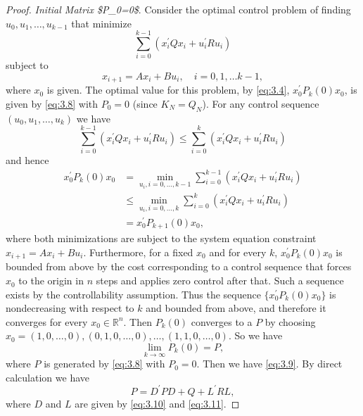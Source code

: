 \begin{proof}
\textit{Initial Matrix \$P\_0=0\$}. 
    Consider the optimal control problem of finding $u_0,u_1,\dots,u_{k-1}$ that minimize
    \[\sum_{i=0}^{k-1} (x_i^\prime Q x_i + u_i^\prime R u_i)\]
    subject to \[x_{i + 1} = Ax_i + Bu_i,\quad i = 0,1,\dots k - 1,\]
    where $x_0$ is given. The optimal value for this problem, by \cref{eq:3.4}, $x_0^\prime P_k(0) x_0$, is given by \cref{eq:3.8} with $P_0=0 $ (since $K_N=Q_N$). 
    For any control sequence ${(u_0,u_1,\dots,u_{k})} $ we have 
    \[\sum_{i=0}^{k-1} (x_i^\prime Q x_i + u_i^\prime R u_i)\leq \sum_{i=0}^{k} (x_i^\prime Q x_i + u_i^\prime R u_i)\]
    and hence 
    \[\begin{aligned}
        x_0^\prime P_k(0) x_0 &=\min_{u_i,i = 0,\dots,k - 1}\sum_{i=0}^{k-1} (x_i^{\prime} Q x_i + u_i^{\prime} R u_i)\\
            &\leq \min_{u_i,i = 0,\dots,k}\sum_{i=0}^{k}
            (x_i^{\prime} Q x_i + u_i^{\prime} R u_i)\\
            &= x_0^\prime P_{k + 1}(0)x_0,
    \end{aligned}\]
    where both minimizations are subject to the system equation constraint $x_{i+1}=A x_i+B u_i$. Furthermore, for a fixed $x_0$ and for every $k$, $x_0^{\prime} P_k(0) x_0$ is bounded from above by the cost corresponding to a control sequence that forces $x_0$ to the origin in $n$ steps and applies zero control after that. Such a sequence exists by the controllability assumption. Thus the sequence $\{x_0^{\prime} P_k(0) x_0\}$ is nondecreasing with respect to $k$ and bounded from above, and therefore it converges for every $x_0\in\mathbb{R}^n$. Then $P_k(0)$ converges to a $P$ by choosing $x_0=(1,0,\dots,0), (0,1,0,\dots,0),\dots,(1,1,0,\dots,0)$. So we have \[\lim_{k\rightarrow\infty}P_k(0) = P,\]
    where $P$ is generated by \cref{eq:3.8} with $P_0=0$. Then we have \cref{eq:3.9}. 
    By direct calculation we have 
    \begin{equation}\label{eq:3.13}
        P = D^\prime P D + Q + L^\prime R L,
    \end{equation}
    where $D$ and $L$ are given by \cref{eq:3.10} and \cref{eq:3.11}. 


\end{proof}
